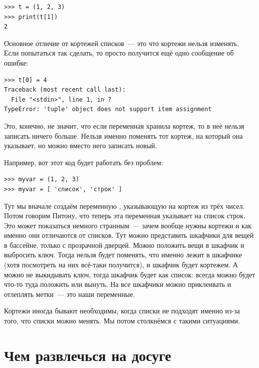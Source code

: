 \begin{listing}
\begin{verbatim}
>>> t = (1, 2, 3)
>>> print(t[1])
2
\end{verbatim}
\end{listing}

Основное отличие от кортежей списков — это что кортежи нельзя изменять. Если попытаться так сделать, то просто получится ещё одно сообщение об ошибке:

\begin{listing}
\begin{verbatim}
>>> t[0] = 4
Traceback (most recent call last):
  File "<stdin>", line 1, in ?
TypeError: 'tuple' object does not support item assignment
\end{verbatim}
\end{listing}

Это, конечно, не значит, что если переменная хранила кортеж, то в неё нельзя записать ничего больше. Нельзя именно поменять тот кортеж, на который она указывает, но можно вместо него записать новый.

Например, вот этот код будет работать без проблем:

\begin{listing}
\begin{verbatim}
>>> myvar = (1, 2, 3)
>>> myvar = [ 'список', 'строк' ]
\end{verbatim}
\end{listing}

Тут мы вначале создаём переменную , указывающую на кортеж из трёх чисел. Потом говорим Питону, что теперь эта переменная указывает на список строк. Это может показаться немного странным — зачем вообще нужны кортежи и как именно они отличаются от списков. Тут можно представить шкафчики для вещей в бассейне, только с прозрачной дверцей. Можно положить вещи в шкафчик и выбросить ключ. Тогда нельзя будет поменять, что именно лежит в шкафчике (хотя посмотреть на них всё-таки получится), и шкафчик будет кортежем. А можно не выкидывать ключ, тогда шкафчик будет как список: всегда можно будет что-то туда положить или вынуть. На все шкафчики можно приклеивать и отлеплять метки — это наши переменные.

Кортежи иногда бывают необходимы, когда списки не подходят именно из-за того, что списки можно менять. Мы потом столкнёмся с такими ситуациями.

\section{Чем развлечься на досуге}

